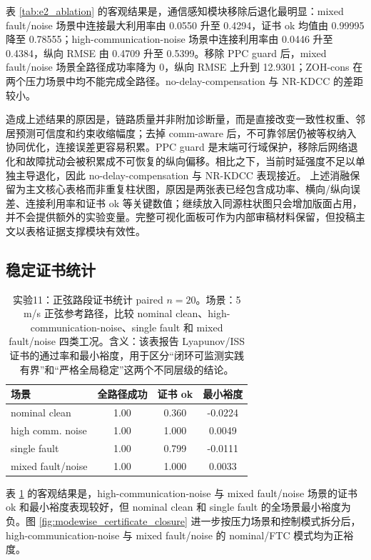 \documentclass[twocolumn,3p,times,procedia]{elsarticle}
\newcommand{\Method}{NR-KDCC}
\newcommand{\ZOHcons}{ZOH-cons}
\begin{document}
表 \ref{tab:e2_ablation} 的客观结果是，通信感知模块移除后退化最明显：mixed fault/noise 场景中连接最大利用率由 0.0550 升至 0.4294，证书 ok 均值由 0.99995 降至 0.78555；high-communication-noise 场景中连接利用率由 0.0446 升至 0.4384，纵向 RMSE 由 0.4709 升至 0.5399。移除 PPC guard 后，mixed fault/noise 场景全路径成功率降为 0，纵向 RMSE 上升到 12.9301；\ZOHcons{} 在两个压力场景中均不能完成全路径。no-delay-compensation 与 \Method{} 的差距较小。

造成上述结果的原因是，链路质量并非附加诊断量，而是直接改变一致性权重、邻居预测可信度和约束收缩幅度；去掉 comm-aware 后，不可靠邻居仍被等权纳入协同优化，连接误差更容易积累。PPC guard 是末端可行域保护，移除后网络退化和故障扰动会被积累成不可恢复的纵向偏移。相比之下，当前时延强度不足以单独主导退化，因此 no-delay-compensation 与 \Method{} 表现接近。
上述消融保留为主文核心表格而非重复柱状图，原因是两张表已经包含成功率、横向/纵向误差、连接利用率和证书 ok 等关键数值；继续放入同源柱状图只会增加版面占用，并不会提供额外的实验变量。完整可视化面板可作为内部审稿材料保留，但投稿主文以表格证据支撑模块有效性。

\subsection{稳定证书统计}

\begin{table}[!t]
\centering
\caption{实验11：正弦路段证书统计 paired $n=20$。场景：5 m/s 正弦参考路径，比较 nominal clean、high-communication-noise、single fault 和 mixed fault/noise 四类工况。含义：该表报告 Lyapunov/ISS 证书的通过率和最小裕度，用于区分“闭环可监测实践有界”和“严格全局稳定”这两个不同层级的结论。}
\label{tab:e3_certificate}
\footnotesize
\begin{tabular}{lccc}
\toprule
场景 & 全路径成功 & 证书 ok & 最小裕度\\
\midrule
nominal clean & 1.00 & 0.360 & -0.0224\\
high comm. noise & 1.00 & 1.000 & 0.0049\\
single fault & 1.00 & 0.799 & -0.0111\\
mixed fault/noise & 1.00 & 1.000 & 0.0033\\
\bottomrule
\end{tabular}
\end{table}

表 \ref{tab:e3_certificate} 的客观结果是，high-communication-noise 与 mixed fault/noise 场景的证书 ok 和最小裕度表现较好，但 nominal clean 和 single fault 的全场景最小裕度为负。图 \ref{fig:modewise_certificate_closure} 进一步按压力场景和控制模式拆分后，high-communication-noise 与 mixed fault/noise 的 nominal/FTC 模式均为正裕度。
\end{document}
